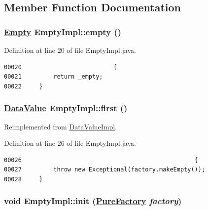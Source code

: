 \subsection{Member Function Documentation}
\hypertarget{classEmptyImpl_f1}{
\subsubsection[empty]{\setlength{\rightskip}{0pt plus 5cm}\hyperlink{interfaceEmpty}{Empty} Empty\-Impl::empty ()}}
\label{classEmptyImpl_f1}




Definition at line 20 of file Empty\-Impl.java.\footnotesize\begin{verbatim}00020                          {
00021         return _empty;
00022     }
\end{verbatim}\normalsize 
\hypertarget{classEmptyImpl_a0}{
\subsubsection[first]{\setlength{\rightskip}{0pt plus 5cm}\hyperlink{interfaceDataValue}{Data\-Value} Empty\-Impl::first ()}}
\label{classEmptyImpl_a0}




Reimplemented from \hyperlink{classDataValueImpl_a0}{Data\-Value\-Impl}.

Definition at line 26 of file Empty\-Impl.java.\footnotesize\begin{verbatim}00026                                                 {
00027         throw new Exceptional(factory.makeEmpty());
00028     }
\end{verbatim}\normalsize 
\hypertarget{classEmptyImpl_f0}{
\subsubsection[init]{\setlength{\rightskip}{0pt plus 5cm}void Empty\-Impl::init (\hyperlink{classPureFactory}{Pure\-Factory} {\em factory})}}
\label{classEmptyImpl_f0}




